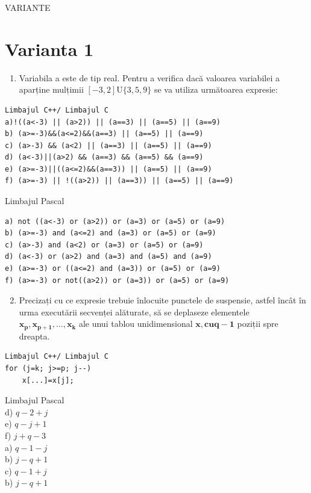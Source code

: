 \documentclass[10pt]{article}
\begin{document}
VARIANTE

\section*{Varianta 1}
\begin{enumerate}
  \item Variabila a este de tip real. Pentru a verifica dacă valoarea variabilei a aparține mulțimii $[-3,2] \mathrm{U}\{3,5,9\}$ se va utiliza următoarea expresie:
\end{enumerate}

\begin{verbatim}
Limbajul C++/ Limbajul C
a)!((a<-3) || (a>2)) || (a==3) || (a==5) || (a==9)
b) (a>=-3)&&(a<=2)&&(a==3) || (a==5) || (a==9)
c) (a>-3) && (a<2) || (a==3) || (a==5) || (a==9)
d) (a<-3)||(a>2) && (a==3) && (a==5) && (a==9)
e) (a>=-3)||((a<=2)&&(a==3)) || (a==5) || (a==9)
f) (a>=-3) || !((a>2)) || (a==3)) || (a==5) || (a==9)
\end{verbatim}

Limbajul Pascal

\begin{verbatim}
a) not ((a<-3) or (a>2)) or (a=3) or (a=5) or (a=9)
b) (a>=-3) and (a<=2) and (a=3) or (a=5) or (a=9)
c) (a>-3) and (a<2) or (a=3) or (a=5) or (a=9)
d) (a<-3) or (a>2) and (a=3) and (a=5) and (a=9)
e) (a>=-3) or ((a<=2) and (a=3)) or (a=5) or (a=9)
f) (a>=-3) or not((a>2)) or (a=3)) or (a=5) or (a=9)
\end{verbatim}

\begin{enumerate}
  \setcounter{enumi}{1}
  \item Precizați cu ce expresie trebuie înlocuite punctele de suspensie, astfel încât în urma executării secvenței alăturate, să se deplaseze elementele $\mathbf{x}_{\mathbf{p}}, \mathbf{x}_{\mathbf{p}+\mathbf{1}}, \ldots, \mathbf{x}_{\mathbf{k}}$ ale unui tablou unidimensional $\mathbf{x}, \mathbf{c u} \mathbf{q - 1}$ poziții spre dreapta.
\end{enumerate}

\begin{verbatim}
Limbajul C++/ Limbajul C
for (j=k; j>=p; j--)
    x[...]=x[j];
\end{verbatim}

Limbajul Pascal\\
d) $q-2+j$\\
e) $q-j+1$\\
f) $j+q-3$\\
a) $q-1-j$\\
b) $j-q+1$\\
c) $q-1+j$\\
b) $j-q+1$
\end{document}
